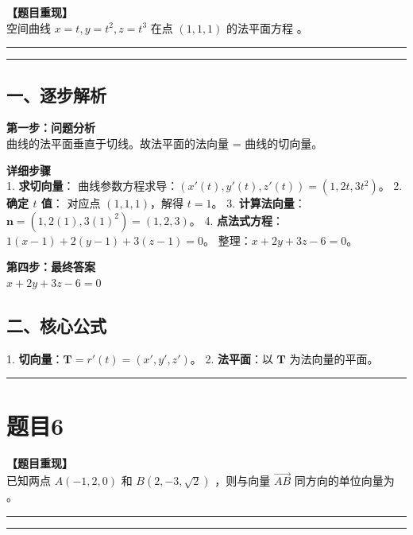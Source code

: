 \documentclass[12pt, a4paper]{ctexart}
\newcommand{\TopSeparator}{
    \par\noindent\rule{\textwidth}{1.5pt}\vspace{0.5em} %
}
\newcommand{\AnalysisSeparator}{
    \par\noindent\rule{\textwidth}{0.5pt}\vspace{0.2em}\hrule\vspace{0.5em} %
}
\newenvironment{RedAnalysis}{
    \par
    \color{red} %
}{
    \par
    \color{black} %
}
\begin{document}
\textbf{【题目重现】} \\
空间曲线 $ x=t,y=t^{2},z=t^{3} $ 在点 $(1,1,1)$ 的法平面方程 \underline{\hspace{2cm}}。

\AnalysisSeparator

\begin{RedAnalysis}

\subsection*{一、逐步解析}

\textbf{第一步：问题分析} \\
曲线的法平面垂直于切线。故法平面的法向量 = 曲线的切向量。

\textbf{详细步骤} \\
1. \textbf{求切向量}：
   曲线参数方程求导：$(x'(t), y'(t), z'(t)) = (1, 2t, 3t^2)$。
2. \textbf{确定 $t$ 值}：
   对应点 $(1,1,1)$，解得 $t=1$。
3. \textbf{计算法向量}：
   $\mathbf{n} = (1, 2(1), 3(1)^2) = (1, 2, 3)$。
4. \textbf{点法式方程}：
   $1(x-1) + 2(y-1) + 3(z-1) = 0$。
   整理：$x + 2y + 3z - 6 = 0$。

\textbf{第四步：最终答案} \\
$ x + 2y + 3z - 6 = 0 $

\subsection*{二、核心公式}
1. \textbf{切向量}：$\mathbf{T} = r'(t) = (x', y', z')$。
2. \textbf{法平面}：以 $\mathbf{T}$ 为法向量的平面。

\end{RedAnalysis}

\vspace{2em}

\TopSeparator
\section*{题目6}

\textbf{【题目重现】} \\
已知两点 $ A(-1,2,0) $ 和 $ B(2,-3,\sqrt{2}) $ ，则与向量 $ \overrightarrow{AB} $ 同方向的单位向量为 \underline{\hspace{2cm}}。

\AnalysisSeparator
\end{document}
